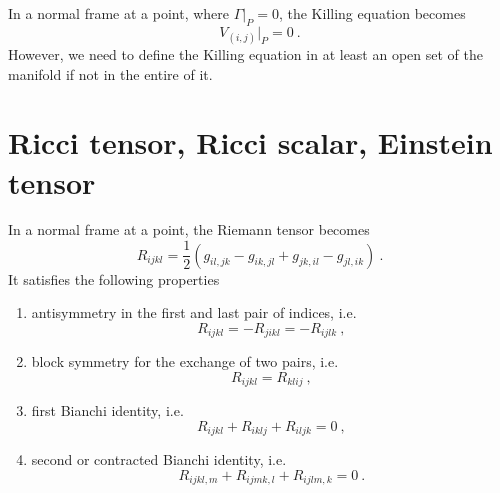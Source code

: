     In a normal frame at a point, where $\Gamma \vert_P = 0$, the Killing equation becomes 
    \begin{equation*}
        V_{(i,j)} \vert_P = 0 ~.
    \end{equation*}
    However, we need to define the Killing equation in at least an open set of the manifold if not in the entire of it.

\chapter{Ricci tensor, Ricci scalar, Einstein tensor}

    In a normal frame at a point, the Riemann tensor becomes 
    \begin{equation*}
        R_{ijkl} = \frac{1}{2} (g_{il,jk} - g_{ik,jl} + g_{jk,il} - g_{jl,ik}) ~.
    \end{equation*}
    It satisfies the following properties 
    \begin{enumerate}
        \item antisymmetry in the first and last pair of indices, i.e. 
        \begin{equation}\label{rieanti}
            R_{ijkl} = - R_{jikl} = - R_{ijlk} ~,
        \end{equation}
        \item block symmetry for the exchange of two pairs, i.e.
        \begin{equation}\label{riesymm}
            R_{ijkl} = R_{klij} ~,
        \end{equation}
        \item first Bianchi identity, i.e. 
        \begin{equation}\label{bianchi1}
            R_{i jkl} + R_{i klj} + R_{i ljk} = 0 ~,
        \end{equation}
        \item second or contracted Bianchi identity, i.e. 
        \begin{equation}\label{bianchi2}
            R_{ijkl,m} + R_{ijmk,l} + R_{ijlm,k} = 0 ~.
        \end{equation}
    \end{enumerate}
